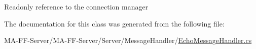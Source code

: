 Readonly reference to the connection manager 



The documentation for this class was generated from the following file\+:\begin{DoxyCompactItemize}
\item 
M\+A-\/\+F\+F-\/\+Server/\+M\+A-\/\+F\+F-\/\+Server/\+Server/\+Message\+Handler/\hyperlink{_echo_message_handler_8cs}{Echo\+Message\+Handler.\+cs}\end{DoxyCompactItemize}

